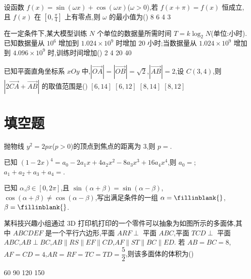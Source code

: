 \begin{problem}
设函数 \(f(x)=\sin(\omega x)+\cos(\omega x)\)(\(\omega>0\)),若 \(f(x+\pi)=f(x)\) 恒成立,且 \(f(x)\) 在 \(\left[0,\frac{\pi}{4}\right]\) 上有零点,则 \(\omega\) 的最小值为(\quad)
\choices
    {8}
    {6}
    {4}
    {3}
\end{problem}

\begin{problem}
在一定条件下,某大模型训练 \(N\) 个单位的数据量所需时间 \(T=k\log_2 N\)(单位:小时). 已知数据量从 \(10^6\) 增加到 \(1.024\times10^9\) 时增加 \(20\) 小时;当数据量从 \(1.024\times10^9\) 增加到 \(4.096\times10^9\) 时,训练时间增加(\quad)
\choices
    {2}
    {4}
    {20}
    {40}
\end{problem}

\begin{problem}
已知平面直角坐标系 \(xOy\) 中,\(|\overrightarrow{OA}|=|\overrightarrow{OB}|=\sqrt2\),\(|\overrightarrow{AB}|=2\),设 \(C(3,4)\),则 \(|2\overrightarrow{CA}+\overrightarrow{AB}|\) 的取值范围是(\quad)
\choices
    {\([6,14]\)}
    {\([6,12]\)}
    {\([8,14]\)}
    {\([8,12]\)}
\end{problem}

\section{填空题}

\begin{problem}
抛物线 \(y^2=2px\)(\(p>0\))的顶点到焦点的距离为 3,则 \(p=\)\fillinblank{}.
\end{problem}

\begin{problem}
已知 \((1-2x)^4=a_0-2a_1x+4a_2x^2-8a_3x^3+16a_4x^4\),则 \(a_0=\);\(a_1+a_2+a_3+a_4=\)\fillinblank{}.
\end{problem}

\begin{problem}
已知 \(\alpha\),\(\beta\in[0,2\pi]\),且 \(\sin(\alpha+\beta)=\sin(\alpha-\beta)\),\(\cos(\alpha+\beta)\ne\cos(\alpha-\beta)\),写出满足条件的一组 \(\alpha=\fillinblank{}\),\(\beta=\fillinblank{}\).
\end{problem}

\begin{problem}
某科技兴趣小组通过 3D 打印机打印的一个零件可以抽象为如图所示的多面体,其中 \(ABCDEF\) 是一个平行六边形,平面 \(ARF\perp\) 平面 \(ABC\),平面 \(TCD\perp\) 平面 \(ABC\),\(AB\perp BC\),\(AB\parallel RS\parallel EF\parallel CD\),\(AF\parallel ST\parallel BC\parallel ED\). 若 \(AB=BC=8\),\(AF=CD=4\),\(AR=RF=TC=TD=\dfrac52\),则该多面体的体积为(\quad)


\choices
    {60}
    {90}
    {120}
    {150}
\end{problem}

